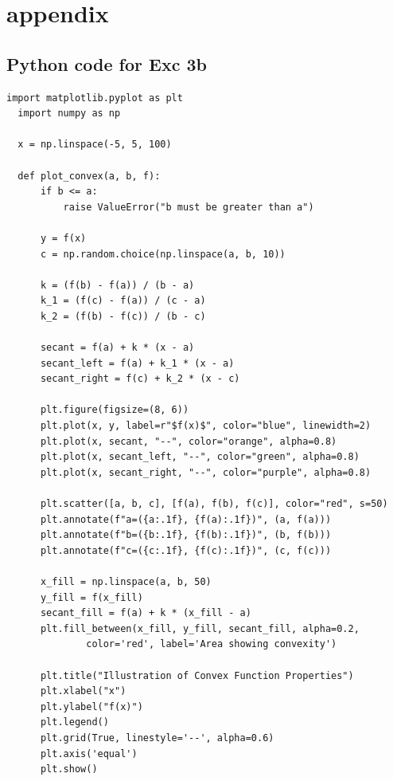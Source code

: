\documentclass[12pt,A4, onecolumn]{exam}
\begin{document}
\begin{questions}
\begin{solution}
   

\end{solution}

\section{appendix}


\subsection{Python code for Exc 3b}



\begin{lstlisting}[style=pythonstyle]
  import matplotlib.pyplot as plt
  import numpy as np

  x = np.linspace(-5, 5, 100)

  def plot_convex(a, b, f):
      if b <= a:
          raise ValueError("b must be greater than a")
      
      y = f(x)
      c = np.random.choice(np.linspace(a, b, 10))
      
      k = (f(b) - f(a)) / (b - a)  
      k_1 = (f(c) - f(a)) / (c - a)  
      k_2 = (f(b) - f(c)) / (b - c)  
      
      secant = f(a) + k * (x - a)  
      secant_left = f(a) + k_1 * (x - a)  
      secant_right = f(c) + k_2 * (x - c)  
      
      plt.figure(figsize=(8, 6))
      plt.plot(x, y, label=r"$f(x)$", color="blue", linewidth=2)
      plt.plot(x, secant, "--", color="orange", alpha=0.8)
      plt.plot(x, secant_left, "--", color="green", alpha=0.8)
      plt.plot(x, secant_right, "--", color="purple", alpha=0.8)
      
      plt.scatter([a, b, c], [f(a), f(b), f(c)], color="red", s=50)
      plt.annotate(f"a=({a:.1f}, {f(a):.1f})", (a, f(a)))
      plt.annotate(f"b=({b:.1f}, {f(b):.1f})", (b, f(b)))
      plt.annotate(f"c=({c:.1f}, {f(c):.1f})", (c, f(c)))
      
      x_fill = np.linspace(a, b, 50)
      y_fill = f(x_fill)
      secant_fill = f(a) + k * (x_fill - a)
      plt.fill_between(x_fill, y_fill, secant_fill, alpha=0.2, 
              color='red', label='Area showing convexity')
      
      plt.title("Illustration of Convex Function Properties")
      plt.xlabel("x")
      plt.ylabel("f(x)")
      plt.legend()
      plt.grid(True, linestyle='--', alpha=0.6)
      plt.axis('equal')
      plt.show()


\end{lstlisting}
\end{questions}
\end{document}
